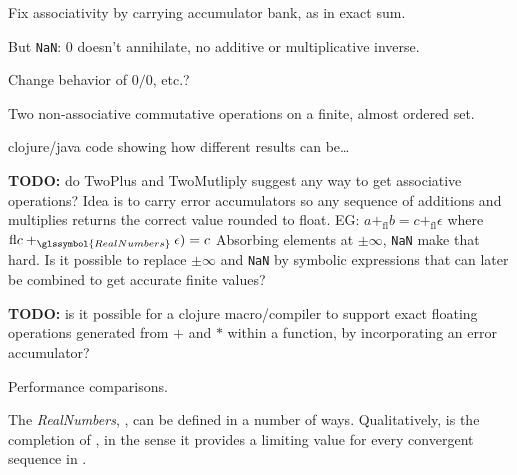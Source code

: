 Fix associativity by carrying accumulator bank,
as in exact sum.

But \texttt{NaN}: $0$ doesn't annihilate,
no additive or multiplicative inverse.

Change behavior of $0 / 0$, etc.?


Two non-associative commutative operations on a finite,
almost ordered set.
\begin{example}

clojure/java code showing how different results can be\ldots
 
\end{example}

\cite{Higham2002ASNA,Muller-et-al-2010,Zhu:2010:A9O:1824801.1824815}

\textbf{TODO:} do TwoPlus and TwoMutliply 
suggest any way to get associative operations?
Idea is to carry error accumulators so 
any sequence of additions and multiplies 
returns the correct  value rounded to float.
EG: $ a +_{\text{fl}} b = c +_{\text{fl}} \epsilon$
where $\text{fl} c +_{\glssymbol{RealNumbers}} \epsilon) = c$
Absorbing elements at $\pm\infty$, \texttt{NaN} make that hard.
Is it possible to replace $\pm\infty$ and \texttt{NaN}
by symbolic expressions that can later be combined to get 
accurate finite values?


\textbf{TODO:} is it possible for a clojure macro/compiler
to support exact floating operations generated from
$+$ and $*$ within a function, by incorporating an error
accumulator?
\label{sec:BigFraction}

Performance comparisons.

\label{sec:Real-numbers}

The \textit{\gls{RealNumbers}}, ,
can be defined in a number of ways. 
Qualitatively,  is the completion of
, 
in the sense it provides a limiting value for every
convergent sequence in .

